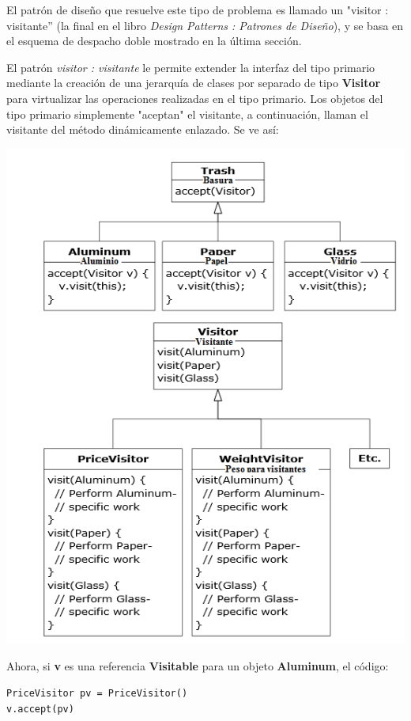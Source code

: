 \documentclass{article}
\begin{document}
El patrón de diseño que resuelve este tipo de problema es llamado un "visitor : visitante” (la final en el libro \textit{Design Patterns : Patrones de Diseño}), y se basa en el esquema de despacho doble mostrado en la última sección. \newline

El patrón \textit{visitor : visitante} le permite extender la interfaz del tipo primario mediante la creación de una jerarquía de clases por separado de tipo \textbf{Visitor} para virtualizar las operaciones realizadas en el tipo primario. Los objetos del tipo primario simplemente "aceptan" el visitante,  a continuación, llaman el visitante del método dinámicamente enlazado. Se ve así:       \newline

\includegraphics[width=\textwidth]{Pagna159}

Ahora, si \textbf{v} es una referencia \textbf{Visitable} para un objeto \textbf{Aluminum}, el código:    \newline

\begin{lstlisting} 
PriceVisitor pv = PriceVisitor() 
v.accept(pv) 
\end{lstlisting}
\end{document}
